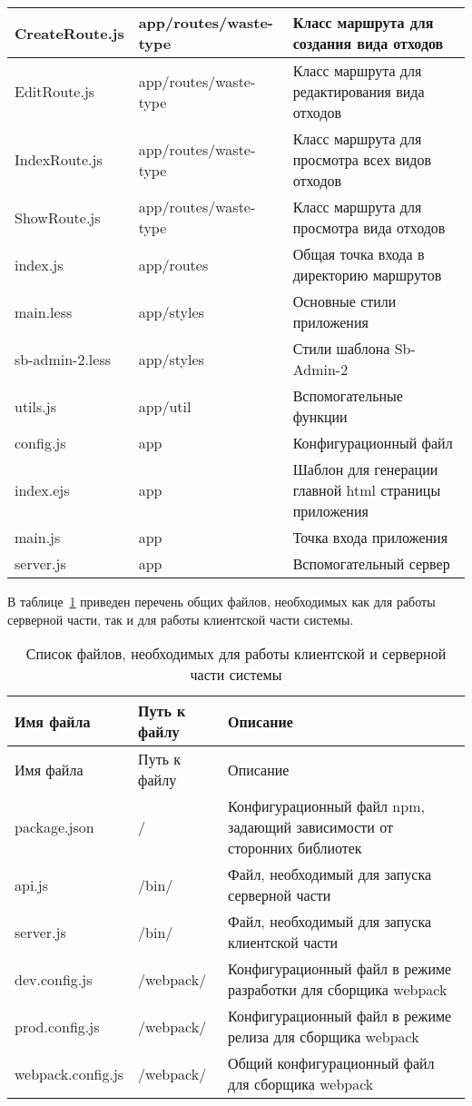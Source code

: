 \documentclass[a4paper]{G2-105}
\begin{document}
\begin{longtable}[l]{|p{4cm}|p{5cm}|p{5.7cm}|}
\hline
CreateRoute.js & app/routes/waste-type & Класс маршрута для создания вида отходов \tabularnewline
\hline
EditRoute.js & app/routes/waste-type & Класс маршрута для редактирования вида отходов \tabularnewline
\hline
IndexRoute.js & app/routes/waste-type & Класс маршрута для просмотра всех видов отходов \tabularnewline
\hline
ShowRoute.js & app/routes/waste-type & Класс маршрута для просмотра вида отходов \tabularnewline
\hline
index.js & app/routes & Общая точка входа в директорию маршрутов \tabularnewline
\hline
main.less & app/styles & Основные стили приложения \tabularnewline
\hline
sb-admin-2.less & app/styles & Стили шаблона Sb-Admin-2 \tabularnewline
\hline
utils.js & app/util & Вспомогательные функции \tabularnewline
\hline
config.js & app & Конфигурационный файл \tabularnewline
\hline
index.ejs & app & Шаблон для генерации главной html страницы приложения \tabularnewline
\hline
main.js & app & Точка входа приложения \tabularnewline
\hline
server.js & app & Вспомогательный сервер \tabularnewline
\end{longtable}

В таблице~\ref{tab:source_files_common} приведен перечень общих файлов, необходимых как для работы серверной части, так и для работы клиентской части системы.

\begin{longtable}[l]{|p{4cm}|p{5cm}|p{5.7cm}|}
\caption{Список файлов, необходимых для работы клиентской и серверной части системы}
\label{tab:source_files_common}\tabularnewline
\hline
Имя файла & Путь к файлу & Описание \tabularnewline
\endfirsthead
\hline
Имя файла & Путь к файлу & Описание \tabularnewline
\endhead
\hline
package.json & / & Конфигурационный файл npm, задающий зависимости от сторонних библиотек \tabularnewline
\hline
api.js & /bin/ & Файл, необходимый для запуска серверной части \tabularnewline
\hline
server.js & /bin/ & Файл, необходимый для запуска клиентской части \tabularnewline
\hline
dev.config.js & /webpack/ & Конфигурационный файл в режиме разработки для сборщика webpack \tabularnewline
\hline
prod.config.js & /webpack/ & Конфигурационный файл в режиме релиза для сборщика webpack \tabularnewline
\hline
webpack.config.js & /webpack/ & Общий конфигурационный файл для сборщика webpack \tabularnewline
\hline
\end{longtable}
\end{document}
